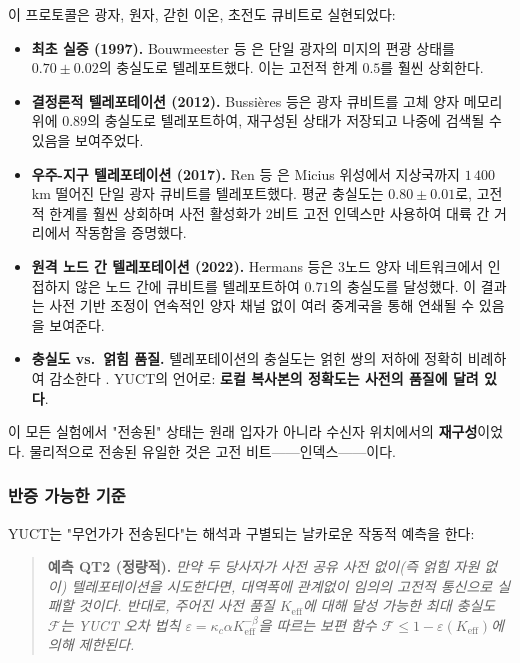 \documentclass[12pt,a4paper]{article}
\begin{document}
	이 프로토콜은 광자, 원자, 갇힌 이온, 초전도 큐비트로 실현되었다:
	
	\begin{itemize}
		\item \textbf{최초 실증 (1997).} Bouwmeester 등 \cite{Bouwmeester1997}은 단일 광자의 미지의 편광 상태를 $0.70 \pm 0.02$의 충실도로 텔레포트했다. 이는 고전적 한계 $0.5$를 훨씬 상회한다.
		\item \textbf{결정론적 텔레포테이션 (2012).} Bussières 등은 광자 큐비트를 고체 양자 메모리 위에 $0.89$의 충실도로 텔레포트하여, 재구성된 상태가 저장되고 나중에 검색될 수 있음을 보여주었다.
		\item \textbf{우주-지구 텔레포테이션 (2017).} Ren 등 \cite{Ren2017}은 Micius 위성에서 지상국까지 $1\,400$ km 떨어진 단일 광자 큐비트를 텔레포트했다. 평균 충실도는 $0.80 \pm 0.01$로, 고전적 한계를 훨씬 상회하며 사전 활성화가 2비트 고전 인덱스만 사용하여 대륙 간 거리에서 작동함을 증명했다.
		\item \textbf{원격 노드 간 텔레포테이션 (2022).} Hermans 등은 3노드 양자 네트워크에서 인접하지 않은 노드 간에 큐비트를 텔레포트하여 $0.71$의 충실도를 달성했다. 이 결과는 사전 기반 조정이 연속적인 양자 채널 없이 여러 중계국을 통해 연쇄될 수 있음을 보여준다.
		\item \textbf{충실도 vs.\ 얽힘 품질.} 텔레포테이션의 충실도는 얽힌 쌍의 저하에 정확히 비례하여 감소한다 \cite{Knill2005}. YUCT의 언어로: \textbf{로컬 복사본의 정확도는 사전의 품질에 달려 있다}.
	\end{itemize}
	
	이 모든 실험에서 "전송된" 상태는 원래 입자가 아니라 수신자 위치에서의 \textbf{재구성}이었다. 물리적으로 전송된 유일한 것은 고전 비트——인덱스——이다.
	
	\subsubsection{반증 가능한 기준}
	
	YUCT는 "무언가가 전송된다"는 해석과 구별되는 날카로운 작동적 예측을 한다:
	
	\begin{quote}
		\textbf{예측 QT2 (정량적).} \emph{만약 두 당사자가 사전 공유 사전 없이(즉 얽힘 자원 없이) 텔레포테이션을 시도한다면, 대역폭에 관계없이 임의의 고전적 통신으로 실패할 것이다. 반대로, 주어진 사전 품질 $K_{\mathrm{eff}}$에 대해 달성 가능한 최대 충실도 $\mathcal{F}$는 YUCT 오차 법칙 $\varepsilon = \kappa_c \alpha K_{\mathrm{eff}}^{-\beta}$을 따르는 보편 함수 $\mathcal{F} \le 1 - \varepsilon(K_{\mathrm{eff}})$에 의해 제한된다.}
	\end{quote}
	
\end{document}
